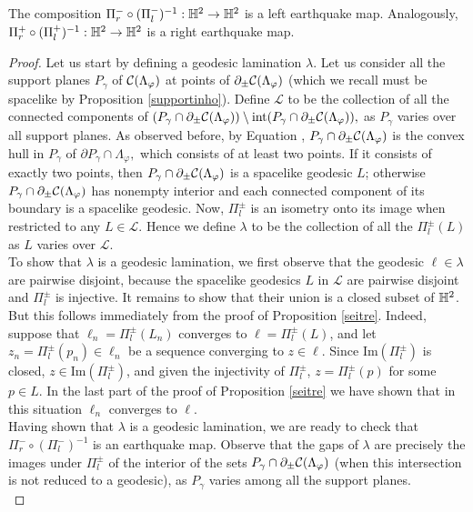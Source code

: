 \begin{proposition}\label{seicinque}
    The composition $\Pi_r^-\circ(\Pi_l^-)^{-1}:\mathbb{H}^2\to\mathbb{H}^{2}$ is a left earthquake map. Analogously, $\Pi_r^+\circ(\Pi_l^+)^{-1}:\mathbb{H}^2\to\mathbb{H}^2$ is a right earthquake map.
\end{proposition}
\begin{proof}
    Let us start by defining a geodesic lamination $\lambda.$ Let us consider all the support planes $P_\gamma$ of $\mathcal{C}(\Lambda_\varphi)$ at points of $\partial_\pm\mathcal{C}(\Lambda_\varphi)$ (which we recall must be spacelike by Proposition \ref{supportinho}). Define $\mathcal{L}$ to be the collection of all the connected components of $(P_\gamma\cap\partial_\pm\mathcal{C}(\Lambda_\varphi))\setminus\text{int}(P_\gamma\cap\partial_\pm\mathcal{C}(\Lambda_\varphi)),$ as $P_\gamma$ varies over all support planes. As observed before, by Equation , $P_\gamma\cap \partial_\pm\mathcal{C}(\Lambda_\varphi)$ is the convex hull in $P_\gamma$ of $\partial P_\gamma\cap\Lambda_\varphi,$ which consists of at least two points. If it consists of exactly two points, then $P_\gamma\cap \partial_\pm\mathcal{C}(\Lambda_\varphi)$ is a spacelike geodesic $L$; otherwise $P_\gamma\cap\partial_\pm\mathcal{C}(\Lambda_\varphi)$ has nonempty interior and each connected component of its boundary is a spacelike geodesic. Now, $\Pi_l^\pm$ is an isometry onto its image when restricted to any $L\in\mathcal{L}.$ Hence we define $\lambda$ to be the collection of all the $\Pi_l^\pm(L)$ as $L$ varies over $\mathcal{L}$. \\
    To show that $\lambda$ is a geodesic lamination, we first observe that the geodesic $\ell\in\lambda$ are pairwise disjoint, because the spacelike geodesics $L$ in $\mathcal{L}$ are pairwise disjoint and $\Pi_l^\pm$ is injective. It remains to show that their union is a closed subset of $\mathbb{H}^2$. But this follows immediately from the proof of Proposition \ref{seitre}. Indeed, suppose that $\ell_n=\Pi_l^\pm(L_n)$ converges to $\ell=\Pi_l^\pm(L)$, and let $z_n=\Pi_l^\pm(p_n)\in\ell_n$ be a sequence converging to $z\in\ell$. Since $\text{Im}(\Pi_l^\pm)$ is closed, $z\in\text{Im}(\Pi_l^\pm)$, and given the injectivity of $\Pi_l^\pm$, $z=\Pi_l^\pm(p)$ for some $p\in L$. In the last part of the proof of Proposition \ref{seitre} we have shown that in this situation $\ell_n$ converges to $\ell$. \\
    Having shown that $\lambda$ is a geodesic lamination, we are ready to check that $\Pi_r^-\circ(\Pi_l^-)^{-1}$ is an earthquake map. Observe that the gaps of $\lambda$ are precisely the images under $\Pi_l^\pm$ of the interior of the sets $P_\gamma\cap\partial_\pm\mathcal{C}(\Lambda_\varphi)$ (when this intersection is not reduced to a geodesic), as $P_\gamma$ varies among all the support planes. \\

\end{proof}
